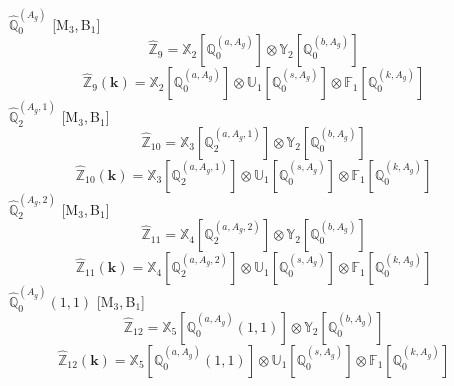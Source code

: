 \documentclass[fleqn,10pt,landscape]{article}
\begin{document}
\begin{itemize}
\vspace{4mm}
\noindent {} $\,\,\,\hat{\mathbb{Q}}_{0}^{(A_{g})}$ [M$_{3}$,\,B$_{1}$]
\begin{dmath*}
\hat{\mathbb{Z}}_{9}=\mathbb{X}_{2}[\mathbb{Q}_{0}^{(a,A_{g})}] \otimes\mathbb{Y}_{2}[\mathbb{Q}_{0}^{(b,A_{g})}]
\end{dmath*}
\begin{dmath*}
\hat{\mathbb{Z}}_{9}(\bm{k})=\mathbb{X}_{2}[\mathbb{Q}_{0}^{(a,A_{g})}] \otimes\mathbb{U}_{1}[\mathbb{Q}_{0}^{(s,A_{g})}] \otimes\mathbb{F}_{1}[\mathbb{Q}_{0}^{(k,A_{g})}]
\end{dmath*}
\vspace{4mm}
\noindent {} $\,\,\,\hat{\mathbb{Q}}_{2}^{(A_{g},1)}$ [M$_{3}$,\,B$_{1}$]
\begin{dmath*}
\hat{\mathbb{Z}}_{10}=\mathbb{X}_{3}[\mathbb{Q}_{2}^{(a,A_{g},1)}] \otimes\mathbb{Y}_{2}[\mathbb{Q}_{0}^{(b,A_{g})}]
\end{dmath*}
\begin{dmath*}
\hat{\mathbb{Z}}_{10}(\bm{k})=\mathbb{X}_{3}[\mathbb{Q}_{2}^{(a,A_{g},1)}] \otimes\mathbb{U}_{1}[\mathbb{Q}_{0}^{(s,A_{g})}] \otimes\mathbb{F}_{1}[\mathbb{Q}_{0}^{(k,A_{g})}]
\end{dmath*}
\vspace{4mm}
\noindent {} $\,\,\,\hat{\mathbb{Q}}_{2}^{(A_{g},2)}$ [M$_{3}$,\,B$_{1}$]
\begin{dmath*}
\hat{\mathbb{Z}}_{11}=\mathbb{X}_{4}[\mathbb{Q}_{2}^{(a,A_{g},2)}] \otimes\mathbb{Y}_{2}[\mathbb{Q}_{0}^{(b,A_{g})}]
\end{dmath*}
\begin{dmath*}
\hat{\mathbb{Z}}_{11}(\bm{k})=\mathbb{X}_{4}[\mathbb{Q}_{2}^{(a,A_{g},2)}] \otimes\mathbb{U}_{1}[\mathbb{Q}_{0}^{(s,A_{g})}] \otimes\mathbb{F}_{1}[\mathbb{Q}_{0}^{(k,A_{g})}]
\end{dmath*}
\vspace{4mm}
\noindent {} $\,\,\,\hat{\mathbb{Q}}_{0}^{(A_{g})}(1,1)$ [M$_{3}$,\,B$_{1}$]
\begin{dmath*}
\hat{\mathbb{Z}}_{12}=\mathbb{X}_{5}[\mathbb{Q}_{0}^{(a,A_{g})}(1,1)] \otimes\mathbb{Y}_{2}[\mathbb{Q}_{0}^{(b,A_{g})}]
\end{dmath*}
\begin{dmath*}
\hat{\mathbb{Z}}_{12}(\bm{k})=\mathbb{X}_{5}[\mathbb{Q}_{0}^{(a,A_{g})}(1,1)] \otimes\mathbb{U}_{1}[\mathbb{Q}_{0}^{(s,A_{g})}] \otimes\mathbb{F}_{1}[\mathbb{Q}_{0}^{(k,A_{g})}]
\end{dmath*}
\vspace{4mm}

\end{itemize}
\end{document}
